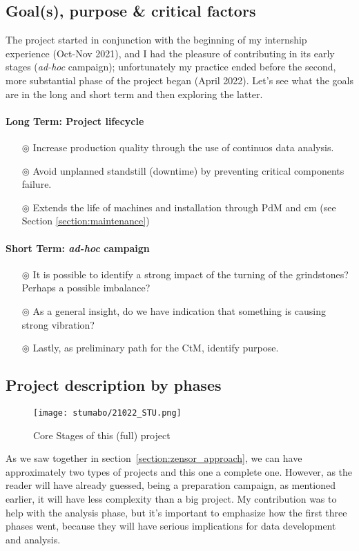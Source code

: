 \subsection{Goal(s), purpose \& critical factors}
The project started in conjunction with the beginning of my internship experience (Oct-Nov 2021), and I had the pleasure of contributing in its early stages (\textit{ad-hoc} campaign);
unfortunately my practice ended before the second, more substantial phase of the project began (April 2022).
Let's see what the goals are in the long and short term and then exploring the latter.
\paragraph{Long Term: Project lifecycle}
\begin{itemize}
    \item[$\circledcirc$] Increase production quality through the use of continuos data analysis.
    \item[$\circledcirc$] Avoid unplanned standstill (downtime) by preventing critical components failure.
    \item[$\circledcirc$] Extends the life of machines and installation through \acl{PdM} and \acl{cm} (see Section \ref{section:maintenance})
\end{itemize}
\paragraph{Short Term: \textit{ad-hoc} campaign}
\begin{itemize}
    \item[$\circledcirc$] It is possible to identify a strong impact of the turning of the grindstones? Perhaps a possible imbalance?
    \item[$\circledcirc$] As a general insight, do we have indication that something is causing strong vibration?
    \item[$\circledcirc$] Lastly, as preliminary path for the \ac{CtM}, identify purpose.
\end{itemize}

\subsection{Project description by phases}
\begin{figure}[ht]
    \texttt{[image: stumabo/21022\_STU.png]}
    \caption{Core Stages of this (full) project}
    \label{fig:stumabo_stages}
\end{figure}
As we saw together in section~\ref{section:zensor_approach}, we can have approximately two types of projects and this one a complete one.
However, as the reader will have already guessed, being a preparation campaign, as mentioned earlier, it will have less complexity than a big project.
My contribution was to help with the analysis phase, but it's important to emphasize how the first three phases went, because they will have serious implications for data development and analysis.

